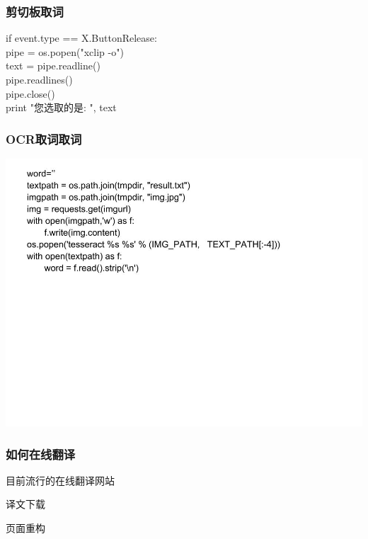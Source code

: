 \documentclass[10pt]{beamer}
\begin{document}
\begin{CJK*}{UTF8}{song}
\begin{frame}
   \frametitle{剪切板取词}
if event.type == X.ButtonRelease: \\
    pipe = os.popen("xclip -o") \\
    text = pipe.readline() \\
    pipe.readlines() \\
    pipe.close() \\
    print "您选取的是: ", text \\
\end{frame}
\begin{frame}
   \frametitle{OCR取词取词}
   \includegraphics[width=1.2\textwidth]{ocr.jpg}
\end{frame}

\begin{frame}
  \frametitle{\Large{如何在线翻译}}
\LARGE\begin{itemize}
 {\item 目前流行的在线翻译网站
  \item 译文下载
  \item 页面重构}
\end{itemize}
\end{frame}


\end{CJK*}
\end{document}

